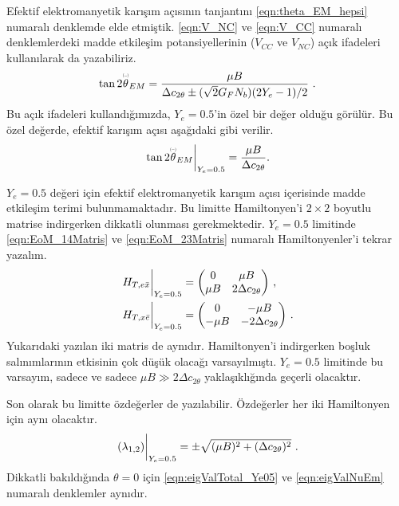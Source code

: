 Efektif elektromanyetik karışım açısının tanjantını \eqref{eqn:theta_EM_hepsi} numaralı denklemde elde etmiştik. \eqref{eqn:V_NC} ve \eqref{eqn:V_CC} numaralı denklemlerdeki madde etkileşim potansiyellerinin ($ V_{CC} $ ve $ V_{NC} $) açık ifadeleri kullanılarak da yazabiliriz. 
\begin{align}
	\tan 2\barparen{\theta}_{EM} = \frac{\mu B}{\Delta c_{2\theta} \pm (\sqrt{2}G_{F}N_{b})(2Y_{e}-1)/2} \text{ .}
\end{align}
Bu açık ifadeleri kullandığımızda, $ Y_{e}=0.5 $'in özel bir değer olduğu görülür. Bu özel değerde, efektif karışım açısı aşağıdaki gibi verilir.
\begin{equation}
	\eval{\tan 2\barparen{\theta}_{EM}}_{Y_{e}=0.5} = \frac{\mu B}{\Delta c_{2\theta}} \text{.}
\end{equation}

$ Y_{e}=0.5 $ değeri için efektif elektromanyetik karışım açısı içerisinde madde etkileşim terimi bulunmamaktadır. Bu limitte Hamiltonyen'i $ 2\times2 $ boyutlu matrise indirgerken dikkatli olunması gerekmektedir. $ Y_{e}=0.5 $ limitinde \eqref{eqn:EoM_14Matris} ve \eqref{eqn:EoM_23Matris} numaralı Hamiltonyenler'i tekrar yazalım.
\begin{align}
	\label{eqn:EoM_14MatrisYe05}\eval{H_{T,e\bar{x}}}_{Y_e=0.5} &= 
	\mqty(0 & \mu B \\ \mu B & 2\Delta c_{2\theta}) \text{ ,}\\
	\label{eqn:EoM_23MatrisYe05}\eval{H_{T,x\bar{e}}}_{Y_e=0.5}&= 
	\mqty(0 & -\mu B \\ -\mu B & -2\Delta c_{2\theta}) \text{ .}
\end{align}
Yukarıdaki yazılan iki matris de aynıdır. Hamiltonyen'i indirgerken boşluk salınımlarının etkisinin çok düşük olacağı varsayılmıştı. $ Y_{e}=0.5 $ limitinde bu varsayım, sadece ve sadece $ \mu B \gg 2\Delta c_{2\theta}$ yaklaşıklığında geçerli olacaktır. %

Son olarak bu limitte özdeğerler de yazılabilir. Özdeğerler her iki Hamiltonyen için aynı olacaktır.
\begin{equation}\label{eqn:eigValTotal_Ye05}
	\eval{(\lambda_{1,2})}_{Y_{e}=0.5} = \pm\sqrt{(\mu B)^{2} + (\Delta c_{2 \theta})^{2}}\text{ .}
\end{equation}
Dikkatli bakıldığında $ \theta = 0 $ için \eqref{eqn:eigValTotal_Ye05} ve \eqref{eqn:eigValNuEm} numaralı denklemler aynıdır. 

